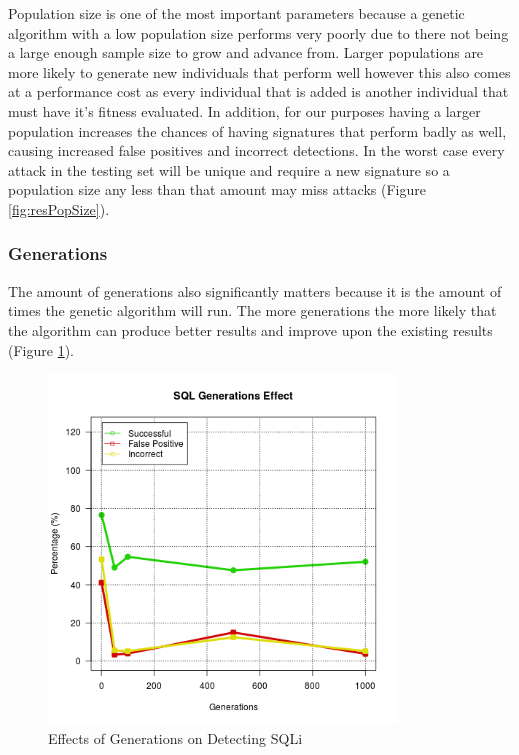 Population size is one of the most important parameters because a genetic algorithm with a low population size performs very poorly due to there not being a large enough sample size to grow and advance from.  Larger populations are more likely to generate new individuals that perform well however this also comes at a performance cost as every individual that is added is another individual that must have it's fitness evaluated.\cite{optimizationOfControlParameters}  In addition, for our purposes having a larger population increases the chances of having signatures that perform badly as well, causing increased false positives and incorrect detections.  In the worst case every attack in the testing set will be unique and require a new signature so a population size any less than that amount may miss attacks (Figure \ref{fig:resPopSize}).

\subsubsection{Generations} \label{sec:resGeneration}

The amount of generations also significantly matters because it is the amount of times the genetic algorithm will run.  The more generations the more likely that the algorithm can produce better results and improve upon the existing results (Figure \ref{fig:resGenerations}).

\begin{figure}[hb]
	\centering
	\includegraphics[width=350px]{./assets/results/ga/generations/Results_SQL.png}
	\caption{Effects of Generations on Detecting SQLi}
	\label{fig:resGenerations}
\end{figure}

